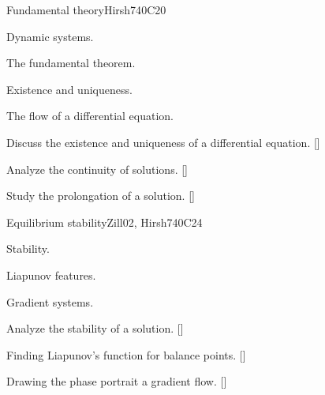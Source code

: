 \begin{syllabus}
\begin{unit}{}{Fundamental theory}{Hirsh74}{0}{C20}
\begin{topics}
      \item Dynamic systems.
      \item The fundamental theorem.
      \item Existence and uniqueness.
      \item The flow of a differential equation.
   \end{topics}
   \begin{learningoutcomes}
      \item Discuss the existence and uniqueness of a differential equation. [\Usage]
      \item Analyze the continuity of solutions. [\Usage]
      \item Study the prolongation of a solution. [\Usage]

   \end{learningoutcomes}
\end{unit}

\begin{unit}{}{Equilibrium stability}{Zill02, Hirsh74}{0}{C24}
\begin{topics}
      \item Stability.
      \item Liapunov features.
      \item Gradient systems.
   \end{topics}
   \begin{learningoutcomes}
      \item Analyze the stability of a solution. [\Usage]
      \item Finding Liapunov's function for balance points. [\Usage]
      \item Drawing the phase portrait a gradient flow. [\Usage]
    \end{learningoutcomes}
\end{unit}

\begin{coursebibliography}
\end{coursebibliography}

\end{syllabus}
